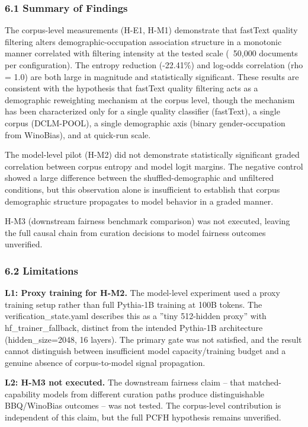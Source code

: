 
\subsubsection{6.1 Summary of Findings}

The corpus-level measurements (H-E1, H-M1) demonstrate that fastText quality filtering alters demographic-occupation association structure in a monotonic manner correlated with filtering intensity at the tested scale (~50,000 documents per configuration). The entropy reduction (-22.41\%) and log-odds correlation (rho = 1.0) are both large in magnitude and statistically significant. These results are consistent with the hypothesis that fastText quality filtering acts as a demographic reweighting mechanism at the corpus level, though the mechanism has been characterized only for a single quality classifier (fastText), a single corpus (DCLM-POOL), a single demographic axis (binary gender-occupation from WinoBias), and at quick-run scale.

The model-level pilot (H-M2) did not demonstrate statistically significant graded correlation between corpus entropy and model logit margins. The negative control showed a large difference between the shuffled-demographic and unfiltered conditions, but this observation alone is insufficient to establish that corpus demographic structure propagates to model behavior in a graded manner.

H-M3 (downstream fairness benchmark comparison) was not executed, leaving the full causal chain from curation decisions to model fairness outcomes unverified.

\subsubsection{6.2 Limitations}

\textbf{L1: Proxy training for H-M2.} The model-level experiment used a proxy training setup rather than full Pythia-1B training at 100B tokens. The verification\_state.yaml describes this as a ''tiny 512-hidden proxy'' with hf\_trainer\_fallback, distinct from the intended Pythia-1B architecture (hidden\_size=2048, 16 layers). The primary gate was not satisfied, and the result cannot distinguish between insufficient model capacity/training budget and a genuine absence of corpus-to-model signal propagation.

\textbf{L2: H-M3 not executed.} The downstream fairness claim -- that matched-capability models from different curation paths produce distinguishable BBQ/WinoBias outcomes -- was not tested. The corpus-level contribution is independent of this claim, but the full PCFH hypothesis remains unverified.

